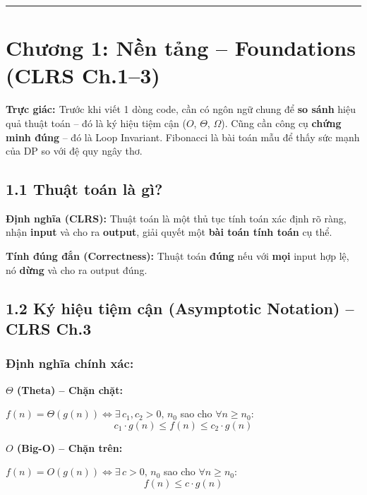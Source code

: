\documentclass[10pt]{article}
\newcommand{\intuition}[1]{%
  \begin{tcolorbox}[colback=blue!5!white, colframe=blue!60!white, leftrule=3pt,
    toprule=0pt, bottomrule=0pt, rightrule=0pt,
    boxsep=2pt, left=6pt, right=6pt, top=4pt, bottom=4pt]
  \small\textbf{\textcolor{blue!80!black}{Trực giác: }}#1
  \end{tcolorbox}}
\begin{document}
\begin{center}\rule{0.5\linewidth}{0.5pt}\end{center}

\section{Chương 1: Nền tảng -- Foundations (CLRS Ch.1--3)}\label{chux1b0ux1a1ng-1-nux1ec1n-tux1ea3ng-foundations-clrs-ch.1-3}

\intuition{Trước khi viết 1 dòng code, cần có ngôn ngữ chung để \textbf{so sánh} hiệu quả thuật toán -- đó là ký hiệu tiệm cận ($O$, $\Theta$, $\Omega$). Cũng cần công cụ \textbf{chứng minh đúng} -- đó là Loop Invariant. Fibonacci là bài toán mẫu để thấy sức mạnh của DP so với đệ quy ngây thơ.}

\subsection{1.1 Thuật toán là gì?}\label{thuux1eadt-touxe1n-luxe0-guxec}

\textbf{Định nghĩa (CLRS):} Thuật toán là một thủ tục tính toán xác định
rõ ràng, nhận \textbf{input} và cho ra \textbf{output}, giải quyết một
\textbf{bài toán tính toán} cụ thể.

\textbf{Tính đúng đắn (Correctness):} Thuật toán \textbf{đúng} nếu với
\textbf{mọi} input hợp lệ, nó \textbf{dừng} và cho ra output đúng.

\subsection{1.2 Ký hiệu tiệm cận (Asymptotic Notation) -- CLRS
Ch.3}\label{kuxfd-hiux1ec7u-tiux1ec7m-cux1eadn-asymptotic-notation-clrs-ch.3}

\subsubsection{Định nghĩa chính
xác:}\label{ux111ux1ecbnh-nghux129a-chuxednh-xuxe1c}

\textbf{\(\Theta\) (Theta) -- Chặn chặt:}

\(f(n) = \Theta(g(n)) \Leftrightarrow \exists\, c_1, c_2 > 0,\, n_0\)
sao cho \(\forall n \geq n_0\):
\[c_1 \cdot g(n) \leq f(n) \leq c_2 \cdot g(n)\]

\textbf{\(O\) (Big-O) -- Chặn trên:}

\(f(n) = O(g(n)) \Leftrightarrow \exists\, c > 0,\, n_0\) sao cho
\(\forall n \geq n_0\): \[f(n) \leq c \cdot g(n)\]
\end{document}
